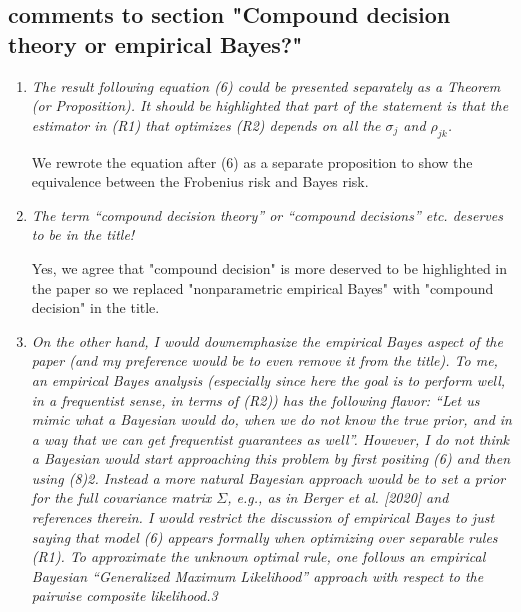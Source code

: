 \documentclass[12pt]{article}
\begin{document}
\subsection{comments to section "Compound decision theory or empirical Bayes?"}
\begin{enumerate}
\item \emph{The result following equation (6) could be presented separately as a Theorem (or Proposition). It should be highlighted that part of the statement is that the estimator in (R1) that optimizes (R2) depends on all the $\sigma_{j}$ and $\rho_{jk}$.}
 
We rewrote the equation after (6) as a separate proposition to show the equivalence between the Frobenius risk and Bayes risk.
\item \emph{The term “compound decision theory” or “compound decisions” etc. deserves to be in the title!}

Yes, we agree that "compound decision" is more deserved to be highlighted in the paper so we replaced "nonparametric empirical Bayes" with "compound decision" in the title.
\item \emph{On the other hand, I would downemphasize the empirical Bayes aspect of the paper (and my preference would be to even remove it from the title). To me, an empirical Bayes analysis (especially since here the goal is to perform well, in a frequentist sense, in terms of (R2)) has the following flavor: “Let us mimic what a Bayesian would do, when we do not know the true prior, and in a way that we can get frequentist guarantees as well”. However, I do not think a Bayesian would start approaching this problem by first positing (6) and then using (8)2. Instead a more natural Bayesian approach would be to set a prior for the full covariance matrix $\Sigma$, e.g., as in Berger et al. [2020] and references therein. I would restrict the discussion of empirical Bayes to just saying that model (6) appears formally when optimizing over separable rules (R1). To approximate the unknown optimal rule, one follows an empirical Bayesian “Generalized Maximum Likelihood” approach with respect to the pairwise composite likelihood.3}
\end{enumerate}
\end{document}

